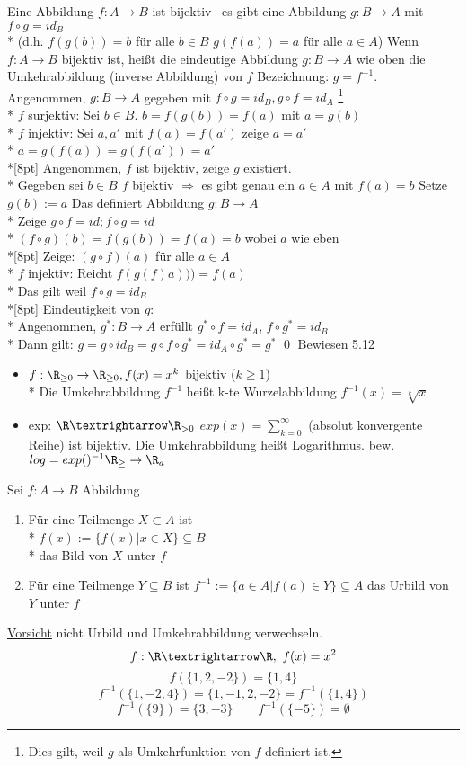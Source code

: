 Eine Abbildung $f: A \to B$ ist bijektiv \equ \ es gibt eine Abbildung $g: B \to A$ mit $f \circ g = id_B$\\*
(d.h. $f(g(b)) = b$ für alle $b \in B$ $g(f(a)) = a$ für alle $a \in A$)
%
Wenn $f:A→B$ bijektiv ist, heißt die eindeutige Abbildung $g:B→A$ wie oben die Umkehrabbildung (inverse Abbildung) von $f$
Bezeichnung: $g=f^{-1}$.
%
\bew
Angenommen, $g: B \to A$ gegeben mit $f \circ g = id_B, g \circ f = id_A$ \footnote{Dies gilt, weil $g$ als Umkehrfunktion von $f$ definiert ist.}\\*
$f$ surjektiv: Sei $b \in B$. $b = f(g(b)) = f(a)$ mit $a = g(b)$ \ok\\*
$f$ injektiv: Sei $a, a'$ mit $f(a) = f(a')$ zeige $a = a'$ \\*
$a = g(f(a)) = g(f(a')) = a' $\ok \\*[8pt]
%
Angenommen, $f$ ist bijektiv, zeige $g$ existiert.\\*
Gegeben sei $b \in B$ $f$ bijektiv $\Rightarrow$ es gibt genau ein $a \in A $ mit $f(a) = b$ 
Setze $g(b):=a$ Das definiert Abbildung $g:B→A$\\*
Zeige $g \circ f=id; f \circ g = id$\\*
$(f\circ g)(b)=f(g(b))=f(a)=b$ wobei $a$ wie eben\\*[8pt]
%
Zeige: $(g \circ f) (a) $ für alle $a \in A$\\*
$f$ injektiv: Reicht $f(g(f)a))) = f(a)$\\*
Das gilt weil $f \circ g = id_B$ \ok\\*[8pt]
Eindeutigkeit von $g$:\\*
Angenommen, $g^* : B \to A$ erfüllt $g^* \circ f = id_A$,
$f \circ g^* = id_B$ \\*
%
Dann gilt: $g=g\circ id_B=g\circ f\circ g^*=id_A\circ g^* = g^*$ \qed
\bsp
Bewiesen 5.12
\begin{itemize}
\item{$f: \R_{\geq 0} \to \R_{\geq 0}, f(x) = x^k$ bijektiv ($k \geq 1$)\\*
Die Umkehrabbildung $f^{-1}$ heißt k-te Wurzelabbildung $f^{-1}(x) = \sqrt[k]{x}$ }
%
\item{exp: $\R→\R_{>0}$ $exp(x) = \sum_{k=0}^{\infty}$ (absolut konvergente Reihe) ist bijektiv. Die Umkehrabbildung heißt Logarithmus. bew.
$log = exp()^{-1} \R_{\geq } \to \R_a$ }
\end{itemize}

Sei $f:A→B$ Abbildung
\begin{enumerate}
\item{Für eine Teilmenge $X \subset A$ ist \\*
$f(x) := \{f(x) | x \in X\} \subseteq B$ \\*
das Bild von $X$ unter $f$}
\item{Für eine Teilmenge $Y \subseteq B$ ist $f^{-1}:=\{a\in A|f(a)\in Y\}\subseteq A$ das Urbild von $Y$ unter $f$}
\end{enumerate}
\ul{Vorsicht} nicht Urbild und Umkehrabbildung verwechseln.
\bsp
$$f:\R→\R,\ f(x)=x^2$$
$$f(\{1, 2, -2\}) = \{1, 4\}$$
$$f^{-1}(\{1,-2,4\})=\{1,-1,2,-2\}=f^{-1}(\{1,4\})$$
$$f^{-1}(\{9\})=\{3,-3\}\qquad f^{-1}(\{-5\})=\emptyset$$

